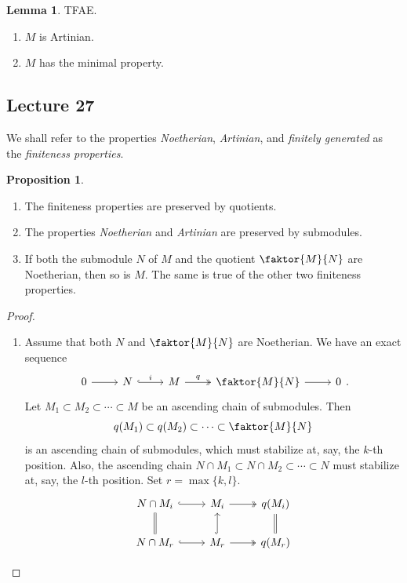 \documentclass[10pt,letterpaper,cm]{nupset}
\theoremstyle{definition}
\theoremstyle{theorem}
\newtheorem{lemma}[definition]{Lemma}
\newtheorem{prop}[definition]{Proposition}
\theoremstyle{remark}
\newcommand{\1}{\mathbf{1}}
\newcommand{\0}{\vec 0}
\begin{document}
\begin{lemma} TFAE.
\begin{enumerate}[label=(\alph*)]
\item $M$ is Artinian.
\item $M$ has the minimal property.
\end{enumerate}
\end{lemma}

\subsection{Lecture 27}

We shall refer to the properties \textit{Noetherian}, \textit{Artinian}, and \textit{finitely generated} as the \textit{finiteness properties}.

\begin{prop} $ $
\begin{enumerate}[label=(\arabic*)]
\item The finiteness properties are preserved by quotients. 
\item The properties \textit{Noetherian} and \textit{Artinian} are preserved by submodules.
\item If both the submodule $N$ of $M$ and the quotient $\faktor{M}{N}$ are Noetherian, then so is $M$. The same is true of the other two finiteness properties.
\end{enumerate}
\begin{proof} $ $
\begin{enumerate}[label=(\arabic*)]
\item Assume that both $N$ and $\faktor{M}{N}$ are Noetherian. We have an exact sequence
\[
\begin{tikzcd}
0 \arrow[r] & N \arrow[r, "i", hook] & M \arrow[r, "q", two heads] & \faktor{M}{N} \arrow[r] & 0
\end{tikzcd}.
\] Let $M_1 \subset M_2 \subset \cdots \subset M$ be an ascending chain of submodules.  Then $$q(M_1) \subset q(M_2) \subset \cdots \subset \faktor{M}{N}$$ is an ascending chain of submodules, which must stabilize at, say, the $k$-th position. Also, the ascending chain $N \cap M_1 \subset N \cap M_2 \subset \cdots \subset N$ must stabilize at, say, the $l$-th position. Set $ r= \max\{k, l\}$.
\[
\begin{tikzcd}
N \cap M_i \arrow[r, hook] & M_i \arrow[r, two heads] & q(M_i) \\
N \cap M_r \arrow[u, equal] \arrow[r, hook] & M_r \arrow[u, hook] \arrow[r, two heads] & q(M_r) \arrow[u, equal]

\end{tikzcd}\]
\end{enumerate}
\end{proof}
\end{prop}
\end{document}
